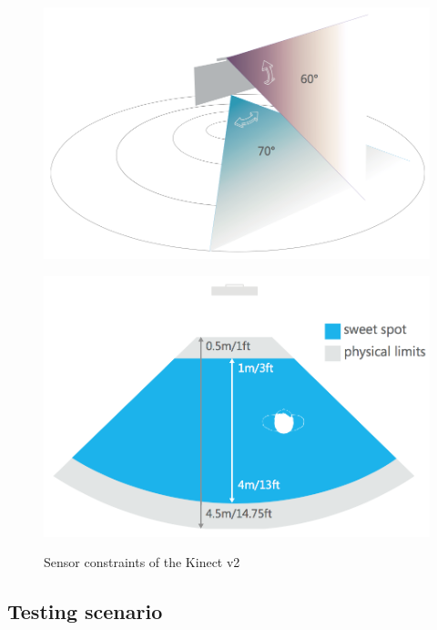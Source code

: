 \begin{figure}[htb]
	\centering
	\begin{minipage}[t]{0.44\linewidth}
		\centering
		\includegraphics[width=1\linewidth]{Pictures/5_1_1_visionAngle}
		\label{fig:5_1_1_visionAngle}
	\end{minipage}
	\hfill
	\begin{minipage}[t]{0.44\linewidth}
		\centering
		\includegraphics[width=1\linewidth]{Pictures/5_1_1_trackingRange}
		\label{fig:5_1_1_trackingRange}
	\end{minipage}
	\caption{Sensor constraints of the Kinect v2~\cite{MicrosoftHIG2014-mh}}
	\label{fig:5_1_1_sensorConstraints}
\end{figure}

\subsection{Testing scenario}

